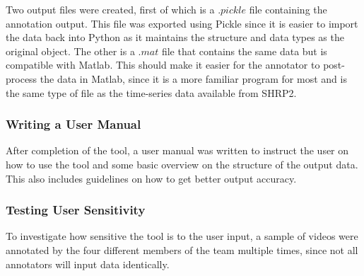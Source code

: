Two output files were created, first of which is a $.pickle$ file containing the annotation output. This file was exported using Pickle since it is easier to import the data back into Python as it maintains the structure and data types as the original object. The other is a $.mat$ file that contains the same data but is compatible with Matlab. This should make it easier for the annotator to post-process the data in Matlab, since it is a more familiar program for most and is the same type of file as the time-series data available from SHRP2. 


\subsubsection{Writing a User Manual}

After completion of the tool, a user manual was written to instruct the user on how to use the tool and some basic overview on the structure of the output data. This also includes guidelines on how to get better output accuracy.

\subsubsection{Testing User Sensitivity}


To investigate how sensitive the tool is to the user input, a sample of videos were annotated by the four different members of the team multiple times, since not all annotators will input data identically. 


